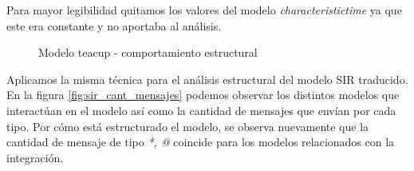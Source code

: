 Para mayor legibilidad quitamos los valores del modelo \textit{characteristictime} ya que este era constante y no aportaba al análisis.



\begin{figure}[H]
    \centering     %
        \caption{Modelo teacup - comportamiento estructural}
\end{figure}


Aplicamos la misma técnica para el análisis estructural del modelo SIR traducido.
En la figura \ref{fig:sir_cant_mensajes} podemos observar los distintos modelos
que interactúan en el modelo así como la cantidad de mensajes que envían por
cada tipo.
Por cómo está estructurado el modelo, se observa nuevamente que la cantidad de
mensaje de tipo \textit{*, @} coincide para los modelos relacionados con la
integración. 

